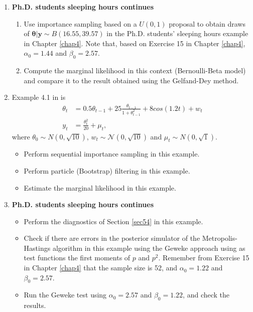 \begin{enumerate}
 \item \textbf{Ph.D. students sleeping hours continues}
\begin{enumerate}
	\item Use importance sampling based on a $U(0,1)$ proposal to obtain draws of $\bm{\theta}|\bm{y} \sim B(16.55,39.57)$ in the Ph.D. students' sleeping hours example in Chapter \ref{chap4}. Note that, based on Exercise 15 in Chapter \ref{chap4}, $\alpha_0 = 1.44$ and $\beta_0 = 2.57$.
	\item Compute the marginal likelihood in this context (Bernoulli-Beta model) and compare it to the result obtained using the Gelfand-Dey method.
\end{enumerate}

\item Example 4.1 in \cite{Gordon1993} is 
\begin{align*}
	\theta_t&=0.5\theta_{t-1}+25\frac{\theta_{t-1}}{1+\theta_{t-1}^2}+8cos(1.2t)+w_t\\
	y_t&=\frac{\theta_{t}^2}{20}+\mu_t,
\end{align*}
where $\theta_0\sim{N}(0,\sqrt{10})$, $w_t\sim\mathcal{N}(0,\sqrt{10})$ and $\mu_t\sim{N}(0,\sqrt{1})$.
\begin{itemize}
	\item Perform sequential importance sampling in this example.
	\item Perform particle (Bootstrap) filtering in this example.
	\item Estimate the marginal likelihood in this example.  
\end{itemize}

\item \textbf{Ph.D. students sleeping hours continues}

\begin{itemize}
	\item Perform the diagnostics of Section \ref{sec54} in this example.
	\item Check if there are errors in the posterior simulator of the Metropolis-Hastings algorithm in this example using the Geweke approach using as test functions the first moments of $p$ and $p^2$. Remember from Exercise 15 in Chapter \ref{chap4} that the sample size is 52, and $\alpha_0=1.22$ and $\beta_0=2.57$.
	\item Run the Geweke test using $\alpha_0=2.57$ and $\beta_0=1.22$, and check the results.
\end{itemize} 
	
\end{enumerate}



